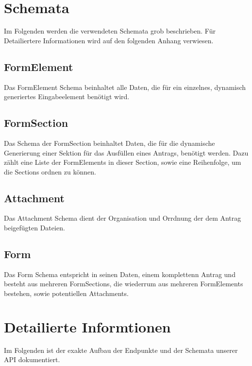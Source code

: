 \section{Schemata}
Im Folgenden werden die verwendeten Schemata grob beschrieben. Für Detailiertere Informationen 
wird auf den folgenden Anhang verwiesen.

\subsection{FormElement}
Das FormElement Schema beinhaltet alle Daten, die für ein einzelnes, dynamisch generiertes 
Eingabeelement benötigt wird.

\subsection{FormSection}
Das Schema der FormSection beinhaltet Daten, die für die dynamische Generierung einer Sektion
für das Ausfüllen eines Antrags, benötigt werden. Dazu zählt eine Liste der FormElements in 
dieser Section, sowie eine Reihenfolge, um die Sections ordnen zu können.

\subsection{Attachment}
Das Attachment Schema dient der Organisation und Orrdnung der dem Antrag beigefügten Dateien.

\subsection{Form}
Das Form Schema entspricht in seinen Daten, einem komplettenn Antrag und besteht aus mehreren 
FormSections, die wiederrum aus mehreren FormElements bestehen, sowie potentiellen Attachments.

\section{Detailierte Informtionen}
Im Folgenden ist der exakte Aufbau der Endpunkte und der Schemata unserer API dokumentiert.

